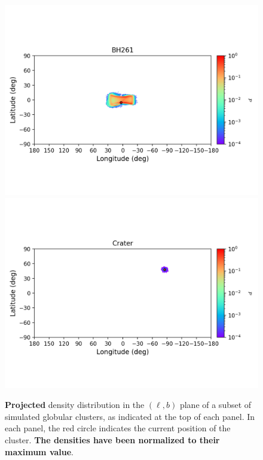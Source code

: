 \begin{figure}
        \includegraphics[clip=true, trim = 0mm 20mm 0mm 10mm, width=1\columnwidth]{images/error_plots_BH261.png}
        \includegraphics[clip=true, trim = 0mm 20mm 0mm 10mm, width=1\columnwidth]{images/error_plots_Crater.png}
        \caption[]{\textbf{Projected} density distribution in the $(\ell, b)$ plane of a subset of simulated globular clusters, as indicated at the top of each panel. In each panel, the red circle indicates the current position of the cluster. \textbf{The densities have been normalized to their maximum value}.}\label{stream1}
        \end{figure}

